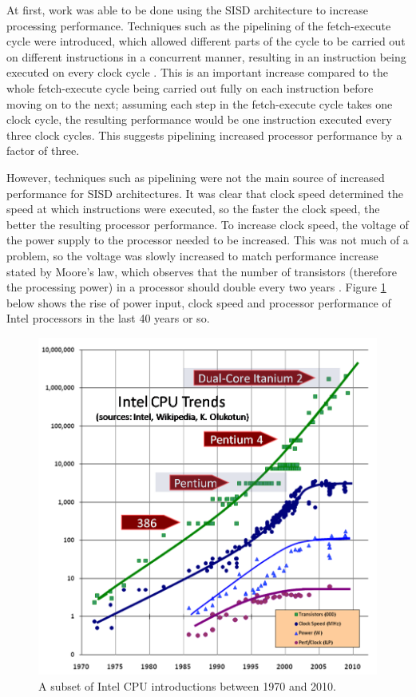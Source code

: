 \documentclass[a4paper, 12pt]{article}
\begin{document}
At first, work was able to be done using the SISD architecture to increase processing performance. Techniques such as the pipelining of the fetch-execute cycle were introduced, which allowed different parts of the cycle to be carried out on different instructions in a concurrent manner, resulting in an instruction being executed on every clock cycle \cite{Iba08}. This is an important increase compared to the whole fetch-execute cycle being carried out fully on each instruction before moving on to the next; assuming each step in the fetch-execute cycle takes one clock cycle, the resulting performance would be one instruction executed every three clock cycles. This suggests pipelining increased processor performance by a factor of three.

However, techniques such as pipelining were not the main source of increased performance for SISD architectures. It was clear that clock speed determined the speed at which instructions were executed, so the faster the clock speed, the better the resulting processor performance. To increase clock speed, the voltage of the power supply to the processor needed to be increased. This was not much of a problem, so the voltage was slowly increased to match performance increase stated by Moore's law, which observes that the number of transistors (therefore the processing power) in a processor should double every two years \cite{Moo65}. Figure \ref{fig:cpu_trends} below shows the rise of power input, clock speed and processor performance of Intel processors in the last 40 years or so.

\begin{figure}[H]
\centering
\includegraphics[width=\textwidth]{trend_graph.png}
\caption[A subset of Intel CPU introductions between 1970 and 2010]{A subset of Intel CPU introductions between 1970 and 2010. \cite{Sut05}}
\label{fig:cpu_trends}
\end{figure}
\end{document}
